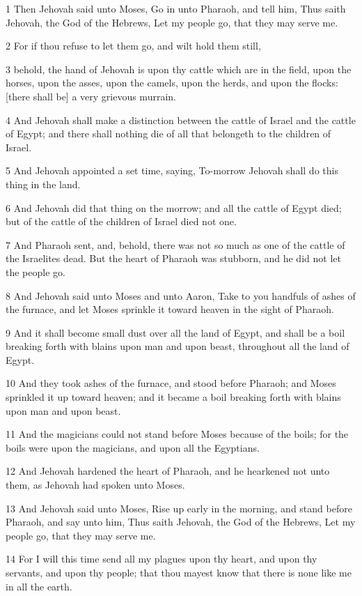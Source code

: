 \par 1 Then Jehovah said unto Moses, Go in unto Pharaoh, and tell him, Thus saith Jehovah, the God of the Hebrews, Let my people go, that they may serve me.
\par 2 For if thou refuse to let them go, and wilt hold them still,
\par 3 behold, the hand of Jehovah is upon thy cattle which are in the field, upon the horses, upon the asses, upon the camels, upon the herds, and upon the flocks: [there shall be] a very grievous murrain.
\par 4 And Jehovah shall make a distinction between the cattle of Israel and the cattle of Egypt; and there shall nothing die of all that belongeth to the children of Israel.
\par 5 And Jehovah appointed a set time, saying, To-morrow Jehovah shall do this thing in the land.
\par 6 And Jehovah did that thing on the morrow; and all the cattle of Egypt died; but of the cattle of the children of Israel died not one.
\par 7 And Pharaoh sent, and, behold, there was not so much as one of the cattle of the Israelites dead. But the heart of Pharaoh was stubborn, and he did not let the people go.
\par 8 And Jehovah said unto Moses and unto Aaron, Take to you handfuls of ashes of the furnace, and let Moses sprinkle it toward heaven in the sight of Pharaoh.
\par 9 And it shall become small dust over all the land of Egypt, and shall be a boil breaking forth with blains upon man and upon beast, throughout all the land of Egypt.
\par 10 And they took ashes of the furnace, and stood before Pharaoh; and Moses sprinkled it up toward heaven; and it became a boil breaking forth with blains upon man and upon beast.
\par 11 And the magicians could not stand before Moses because of the boils; for the boils were upon the magicians, and upon all the Egyptians.
\par 12 And Jehovah hardened the heart of Pharaoh, and he hearkened not unto them, as Jehovah had spoken unto Moses.
\par 13 And Jehovah said unto Moses, Rise up early in the morning, and stand before Pharaoh, and say unto him, Thus saith Jehovah, the God of the Hebrews, Let my people go, that they may serve me.
\par 14 For I will this time send all my plagues upon thy heart, and upon thy servants, and upon thy people; that thou mayest know that there is none like me in all the earth.
